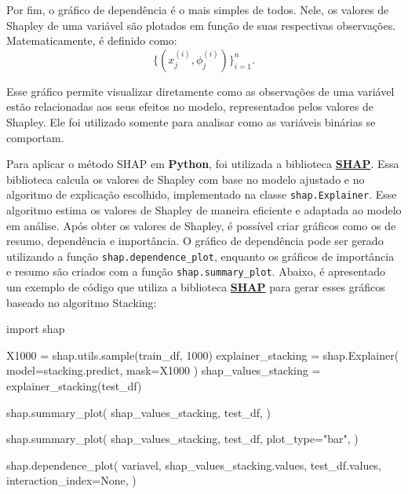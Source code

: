 \documentclass[
  12pt,
  a4paper,
]{scrreprt}
\newenvironment{Shaded}{}{}
\newcommand{\DecValTok}[1]{\textcolor[rgb]{0.00,0.36,0.77}{#1}}
\newcommand{\ImportTok}[1]{\textcolor[rgb]{0.01,0.18,0.38}{#1}}
\newcommand{\NormalTok}[1]{\textcolor[rgb]{0.14,0.16,0.18}{#1}}
\newcommand{\OperatorTok}[1]{\textcolor[rgb]{0.14,0.16,0.18}{#1}}
\newcommand{\StringTok}[1]{\textcolor[rgb]{0.01,0.18,0.38}{#1}}
\newcommand{\VariableTok}[1]{\textcolor[rgb]{0.89,0.38,0.04}{#1}}
\begin{document}
Por fim, o gráfico de dependência é o mais simples de todos. Nele, os
valores de Shapley de uma variável são plotados em função de suas
respectivas observações. Matematicamente, é definido como: \[
\{\left(x_j^{\left(i\right)}, \phi_j^{\left(i\right)} \right)\}^{n}_{i=1}\text{.}
\]

Esse gráfico permite visualizar diretamente como as observações de uma
variável estão relacionadas aos seus efeitos no modelo, representados
pelos valores de Shapley. Ele foi utilizado somente para analisar como
as variáveis binárias se comportam.

\vspace{12pt}

Para aplicar o método SHAP em \textbf{Python}, foi utilizada a
biblioteca \href{https://shap.readthedocs.io/en/latest/}{\textbf{SHAP}}.
Essa biblioteca calcula os valores de Shapley com base no modelo
ajustado e no algoritmo de explicação escolhido, implementado na classe
\texttt{shap.Explainer}. Esse algoritmo estima os valores de Shapley de
maneira eficiente e adaptada ao modelo em análise. Após obter os valores
de Shapley, é possível criar gráficos como os de resumo, dependência e
importância. O gráfico de dependência pode ser gerado utilizando a
função \texttt{shap.dependence\_plot}, enquanto os gráficos de
importância e resumo são criados com a função
\texttt{shap.summary\_plot}. Abaixo, é apresentado um exemplo de código
que utiliza a biblioteca
\href{https://shap.readthedocs.io/en/latest/}{\textbf{SHAP}} para gerar
esses gráficos baseado no algoritmo Stacking:

\begin{Shaded}
\begin{Highlighting}[]
\ImportTok{import}\NormalTok{ shap}

\NormalTok{X1000 }\OperatorTok{=}\NormalTok{ shap.utils.sample(train\_df, }\DecValTok{1000}\NormalTok{)}
\NormalTok{explainer\_stacking }\OperatorTok{=}\NormalTok{ shap.Explainer(}
\NormalTok{    model}\OperatorTok{=}\NormalTok{stacking.predict,}
\NormalTok{    mask}\OperatorTok{=}\NormalTok{X1000}
\NormalTok{    )}
\NormalTok{shap\_values\_stacking }\OperatorTok{=}\NormalTok{ explainer\_stacking(test\_df)}

\NormalTok{shap.summary\_plot(}
\NormalTok{    shap\_values\_stacking,}
\NormalTok{    test\_df,}
\NormalTok{    )}

\NormalTok{shap.summary\_plot(}
\NormalTok{    shap\_values\_stacking,}
\NormalTok{    test\_df,}
\NormalTok{    plot\_type}\OperatorTok{=}\StringTok{"bar"}\NormalTok{,}
\NormalTok{    )}

\NormalTok{shap.dependence\_plot(}
\NormalTok{    variavel,}
\NormalTok{    shap\_values\_stacking.values,}
\NormalTok{    test\_df.values,}
\NormalTok{    interaction\_index}\OperatorTok{=}\VariableTok{None}\NormalTok{,}
\NormalTok{    )}
\end{Highlighting}
\end{Shaded}
\end{document}
